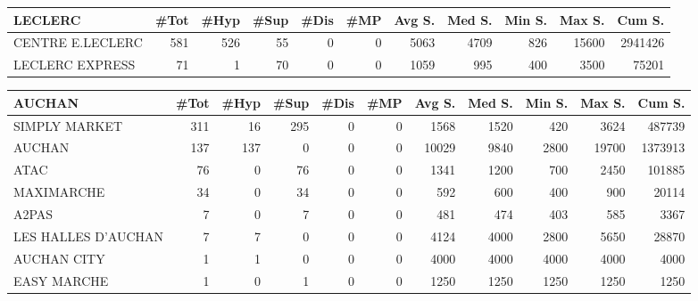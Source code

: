 \documentclass[11pt]{article}
\begin{document}
\begin{table}[H]
\footnotesize
\setlength{\tabcolsep}{2pt}
\begin{tabular}{lrrrrrrrrrr}
\toprule
LECLERC &       \#Tot &       \#Hyp &       \#Sup &       \#Dis &        \#MP &     Avg S. &     Med S. &     Min S. &     Max S. &     Cum S. \\
\midrule
CENTRE E.LECLERC &        581 &        526 &         55 &          0 &          0 &       5063 &       4709 &        826 &      15600 &    2941426 \\
LECLERC EXPRESS  &         71 &          1 &         70 &          0 &          0 &       1059 &        995 &        400 &       3500 &      75201 \\
\bottomrule
\end{tabular}
\end{table}

\begin{table}[H]
\footnotesize
\setlength{\tabcolsep}{2pt}
\begin{tabular}{lrrrrrrrrrr}
\toprule
AUCHAN &       \#Tot &       \#Hyp &       \#Sup &       \#Dis &        \#MP &     Avg S. &     Med S. &     Min S. &     Max S. &     Cum S. \\
\midrule
SIMPLY MARKET       &        311 &         16 &        295 &          0 &          0 &       1568 &       1520 &        420 &       3624 &     487739 \\
AUCHAN              &        137 &        137 &          0 &          0 &          0 &      10029 &       9840 &       2800 &      19700 &    1373913 \\
ATAC                &         76 &          0 &         76 &          0 &          0 &       1341 &       1200 &        700 &       2450 &     101885 \\
MAXIMARCHE          &         34 &          0 &         34 &          0 &          0 &        592 &        600 &        400 &        900 &      20114 \\
A2PAS               &          7 &          0 &          7 &          0 &          0 &        481 &        474 &        403 &        585 &       3367 \\
LES HALLES D'AUCHAN &          7 &          7 &          0 &          0 &          0 &       4124 &       4000 &       2800 &       5650 &      28870 \\
AUCHAN CITY         &          1 &          1 &          0 &          0 &          0 &       4000 &       4000 &       4000 &       4000 &       4000 \\
EASY MARCHE         &          1 &          0 &          1 &          0 &          0 &       1250 &       1250 &       1250 &       1250 &       1250 \\
\bottomrule
\end{tabular}
\end{table}
\end{document}
